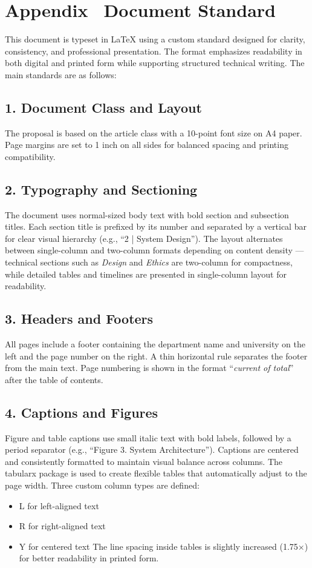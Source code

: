 \section*{Appendix \thesection \, \textbar \vspace{0.5em} Document Standard}
\label{sec:appendix-document-standard}

This document is typeset in LaTeX using a custom standard designed for clarity, consistency, and professional presentation. The format emphasizes readability in both digital and printed form while supporting structured technical writing. The main standards are as follows:
\subsection*{1. Document Class and Layout}
The proposal is based on the article class with a 10-point font size on A4 paper. Page margins are set to 1 inch on all sides for balanced spacing and printing compatibility.
\subsection*{2. Typography and Sectioning}
The document uses normal-sized body text with bold section and subsection titles. Each section title is prefixed by its number and separated by a vertical bar for clear visual hierarchy (e.g., “2 | System Design”).
The layout alternates between single-column and two-column formats depending on content density — technical sections such as \textit{Design} and \textit{Ethics} are two-column for compactness, while detailed tables and timelines are presented in single-column layout for readability.
\subsection*{3. Headers and Footers}
All pages include a footer containing the department name and university on the left and the page number on the right. A thin horizontal rule separates the footer from the main text. Page numbering is shown in the format “\textit{current of total}” after the table of contents.
\subsection*{4. Captions and Figures}
Figure and table captions use small italic text with bold labels, followed by a period separator (e.g., “Figure 3. System Architecture”). Captions are centered and consistently formatted to maintain visual balance across columns.
The tabularx package is used to create flexible tables that automatically adjust to the page width. Three custom column types are defined:
\begin{itemize}
    \item
    L for left-aligned text
    \item
    R for right-aligned text
    \item
    Y for centered text
    The line spacing inside tables is slightly increased (1.75×) for better readability in printed form.
    \end{itemize}
